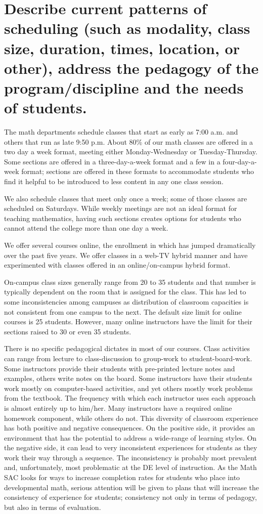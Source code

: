 \section{Describe current patterns of scheduling (such as modality, class size, duration, times, location, or other),  address the pedagogy of the program/discipline and the needs of students.} 
The math departments schedule classes that start as early as 7:00 a.m. and others that run as late 9:50 p.m.  About 80\% of our math classes are offered in a two day a week format, meeting either Monday-Wednesday or Tuesday-Thursday.  Some sections are offered in a three-day-a-week format and a few in a four-day-a-week format; sections are offered in these formats to accommodate students who find it helpful to be introduced to less content in any one class session.  

We also schedule classes that meet only once a week; some of those classes are scheduled on  Saturdays.   While weekly meetings are not an ideal format for teaching mathematics, having such sections creates options for students who cannot attend the college more than one day a week.  

 We offer several courses online, the enrollment in which has jumped dramatically over the past five years.  We offer classes in a web-TV hybrid manner and have experimented with classes offered in an online/on-campus hybrid format.

 On-campus class sizes generally range from 20 to 35 students and that number is typically dependent on the room that is assigned for the class.  This has led to some inconsistencies among campuses as distribution of classroom capacities is not consistent from one campus to the next.   The default size limit for online courses is 25 students.  However, many online instructors have the limit for their sections raised to 30 or even 35 students. 

 There is no specific pedagogical dictates in most of our courses.  Class activities can range from lecture to class-discussion to group-work to student-board-work. Some instructors provide their students with pre-printed lecture notes and examples, others write notes on the board. Some instructors have their students work mostly on computer-based activities, and yet others mostly work problems from the textbook. The frequency with which each instructor uses each approach is almost entirely up to him/her.  Many instructors have a required online homework component, while others do not.  This diversity of classroom experience has both positive and negative consequences.  On the positive side, it provides an environment that has the potential to address a wide-range of learning styles.  On the negative side, it can lead to very inconsistent experiences for students as they work their way through a sequence.  The inconsistency is probably most prevalent and, unfortunately, most  problematic at the DE level of instruction.  As the Math SAC looks for ways to increase completion rates for students who place into developmental math, serious attention will be given to plans that will increase the consistency of experience for students; consistency not only in terms of pedagogy, but also in terms of evaluation.
